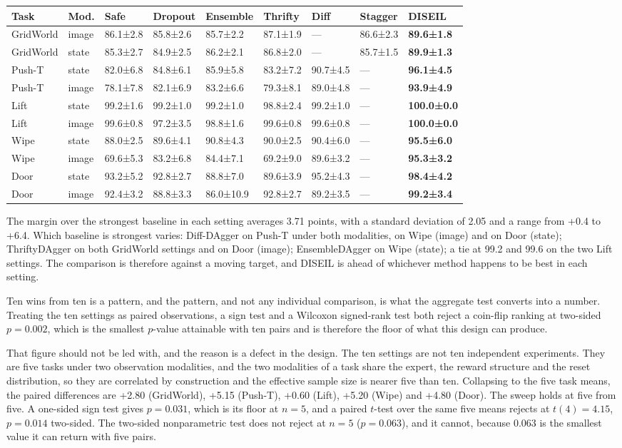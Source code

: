 \documentclass[
  11pt,
]{article}
\begin{document}
\begin{longtable}[]{@{}lllllllll@{}}
\toprule
Task & Mod. & Safe & Dropout & Ensemble & Thrifty & Diff & Stagger &
DISEIL\tabularnewline
\midrule
\endhead
GridWorld & image & 86.1±2.8 & 85.8±2.6 & 85.7±2.2 & 87.1±1.9 & --- &
86.6±2.3 & \textbf{89.6±1.8}\tabularnewline
GridWorld & state & 85.3±2.7 & 84.9±2.5 & 86.2±2.1 & 86.8±2.0 & --- &
85.7±1.5 & \textbf{89.9±1.3}\tabularnewline
Push-T & state & 82.0±6.8 & 84.8±6.1 & 85.9±5.8 & 83.2±7.2 & 90.7±4.5 &
--- & \textbf{96.1±4.5}\tabularnewline
Push-T & image & 78.1±7.8 & 82.1±6.9 & 83.2±6.6 & 79.3±8.1 & 89.0±4.8 &
--- & \textbf{93.9±4.9}\tabularnewline
Lift & state & 99.2±1.6 & 99.2±1.0 & 99.2±1.0 & 98.8±2.4 & 99.2±1.0 &
--- & \textbf{100.0±0.0}\tabularnewline
Lift & image & 99.6±0.8 & 97.2±3.5 & 98.8±1.6 & 99.6±0.8 & 99.6±0.8 &
--- & \textbf{100.0±0.0}\tabularnewline
Wipe & state & 88.0±2.5 & 89.6±4.1 & 90.8±4.3 & 90.0±2.5 & 90.4±6.0 &
--- & \textbf{95.5±6.0}\tabularnewline
Wipe & image & 69.6±5.3 & 83.2±6.8 & 84.4±7.1 & 69.2±9.0 & 89.6±3.2 &
--- & \textbf{95.3±3.2}\tabularnewline
Door & state & 93.2±5.2 & 92.8±2.7 & 88.8±7.0 & 89.6±3.9 & 95.2±4.3 &
--- & \textbf{98.4±4.2}\tabularnewline
Door & image & 92.4±3.2 & 88.8±3.3 & 86.0±10.9 & 92.8±2.7 & 89.2±3.5 &
--- & \textbf{99.2±3.4}\tabularnewline
\bottomrule
\end{longtable}

The margin over the strongest baseline in each setting averages 3.71
points, with a standard deviation of 2.05 and a range from +0.4 to +6.4.
Which baseline is strongest varies: Diff-DAgger on Push-T under both
modalities, on Wipe (image) and on Door (state); ThriftyDAgger on both
GridWorld settings and on Door (image); EnsembleDAgger on Wipe (state);
a tie at 99.2 and 99.6 on the two Lift settings. The comparison is
therefore against a moving target, and DISEIL is ahead of whichever
method happens to be best in each setting.

Ten wins from ten is a pattern, and the pattern, and not any individual
comparison, is what the aggregate test converts into a number. Treating
the ten settings as paired observations, a sign test and a Wilcoxon
signed-rank test both reject a coin-flip ranking at two-sided
\(p = 0.002\), which is the smallest \(p\)-value attainable with ten
pairs and is therefore the floor of what this design can produce.

That figure should not be led with, and the reason is a defect in the
design. The ten settings are not ten independent experiments. They are
five tasks under two observation modalities, and the two modalities of a
task share the expert, the reward structure and the reset distribution,
so they are correlated by construction and the effective sample size is
nearer five than ten. Collapsing to the five task means, the paired
differences are +2.80 (GridWorld), +5.15 (Push-T), +0.60 (Lift), +5.20
(Wipe) and +4.80 (Door). The sweep holds at five from five. A one-sided
sign test gives \(p = 0.031\), which is its floor at \(n = 5\), and a
paired \(t\)-test over the same five means rejects at \(t(4) = 4.15\),
\(p = 0.014\) two-sided. The two-sided nonparametric test does not
reject at \(n = 5\) (\(p = 0.063\)), and it cannot, because 0.063 is the
smallest value it can return with five pairs.
\end{document}
